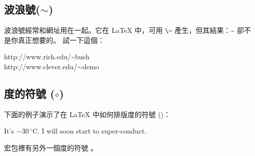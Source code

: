
\subsection{波浪號\texorpdfstring{($\sim$)}{}}

波浪號經常和網址用在一起。它在
 \LaTeX{} 中，可用 \verb|\~| 產生，但其結果：\~{} 卻不是你真正想要的。
試一下這個：

%
\begin{example}
http://www.rich.edu/\~{}bush \\
http://www.clever.edu/$\sim$demo
\end{example}

\subsection{度的符號\texorpdfstring{ ($\circ$)}{}}

下面的例子演示了在 \LaTeX{} 中如何排版度的符號 ()：

\begin{example}
It's $-30\,^{\circ}\mathrm{C}$.
I will soon start to
super-conduct.
\end{example}

 宏包裡有另外一個度的符號 。

